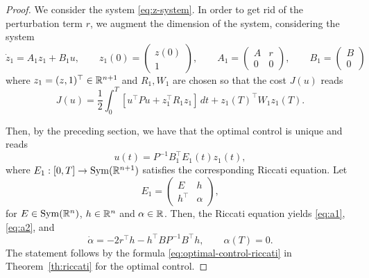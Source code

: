 \begin{proof}
    We consider the system \eqref{eq:z-system}.
    In order to get rid of the perturbation term $r$, we augment the dimension of the system, considering the system
    \begin{equation}
        \dot z_1 = A_1z_1+B_1 u,
        \qquad
        z_1(0)=\begin{pmatrix}
            z(0) \\1
        \end{pmatrix},
        \qquad
        A_1 =
        \begin{pmatrix}
            A & r \\ 0 & 0
        \end{pmatrix},
        \qquad
        B_1 =
        \begin{pmatrix}
            B \\ 0
        \end{pmatrix}
    \end{equation}
    where $z_1 = (z,1)^\top \in \mathbb{R}^{n+1}$ and $R_1, W_1$ are chosen so that the cost $J(u)$ reads
    \begin{equation}
        J(u) = \frac{1}2\int_0^T \left[ u^\top P u + z_1^\top R_1 z_ 1 \right] \, dt + z_1(T)^\top W_1 z_1(T).
    \end{equation}

    Then, by the preceding section, we have that the optimal control is unique and reads
    \begin{equation}
        u(t) = P^{-1}B_1^\top E_1(t)z_1(t),
    \end{equation}
    where $E_1:[0,T]\to \operatorname{Sym}(\mathbb{R}^{n+1})$ satisfies the corresponding Riccati equation. 
    Let
    \begin{equation}
       E_1 = 
       \begin{pmatrix}
        E & h \\ h^\top & \alpha 
       \end{pmatrix} ,
    \end{equation}
    for $E\in \operatorname{Sym}(\mathbb{R}^n)$, $h\in \mathbb{R}^n$ and $\alpha\in \mathbb{R}$. Then, the Riccati equation yields \eqref{eq:a1}, \eqref{eq:a2}, and
    \begin{equation}
        \dot \alpha = -2r^\top h - h^\top BP^{-1}B^\top h, \qquad \alpha(T) = 0.
    \end{equation}
    The statement follows by the formula \eqref{eq:optimal-control-riccati} in Theorem~\ref{th:riccati} for the optimal control.
\end{proof}
